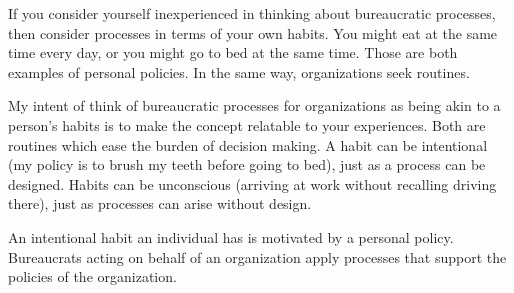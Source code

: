 
If you consider yourself inexperienced in thinking about bureaucratic processes, then consider processes in terms of your own habits. You might eat at the same time every day, or you might go to bed at the same time. Those are both examples of personal policies. In the same way, organizations seek routines. 

My intent of think of bureaucratic processes for organizations as being akin to a person's habits is to make the concept relatable to your experiences. Both are routines which ease the burden of decision making. A habit can be intentional (my policy is to brush my teeth before going to bed), just as a process can be designed. Habits can be unconscious (arriving at work without recalling driving there), just as processes can arise without design. 

An intentional habit an individual has is motivated by a personal policy. Bureaucrats acting on behalf of an organization apply processes that support the policies of the organization.

